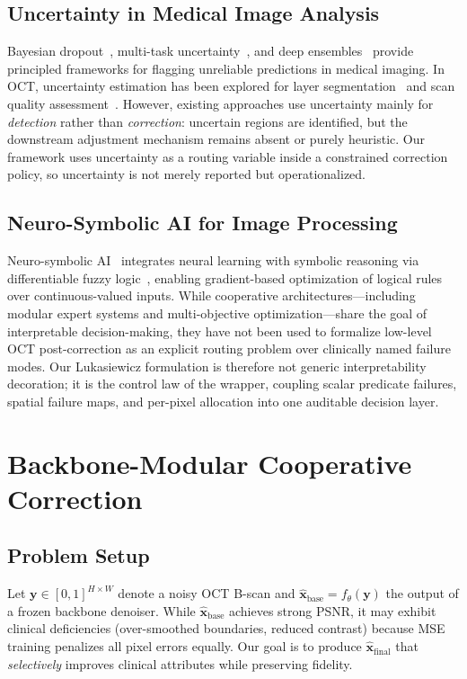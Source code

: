 \documentclass{ieeetj}
\begin{document}
\subsection{Uncertainty in Medical Image Analysis}
Bayesian dropout~\cite{gal2016dropout}, multi-task uncertainty~\cite{kendall2018multi}, and deep ensembles~\cite{lakshminarayanan2017simple} provide principled frameworks for flagging unreliable predictions in medical imaging. In OCT, uncertainty estimation has been explored for layer segmentation~\cite{devalla2018drunet} and scan quality assessment~\cite{wang2019quality}. However, existing approaches use uncertainty mainly for \emph{detection} rather than \emph{correction}: uncertain regions are identified, but the downstream adjustment mechanism remains absent or purely heuristic. Our framework uses uncertainty as a routing variable inside a constrained correction policy, so uncertainty is not merely reported but operationalized.

\subsection{Neuro-Symbolic AI for Image Processing}
Neuro-symbolic AI~\cite{garcez2023neurosymbolic} integrates neural learning with symbolic reasoning via differentiable fuzzy logic~\cite{vankrieken2022analyzing}, enabling gradient-based optimization of logical rules over continuous-valued inputs. While cooperative architectures---including modular expert systems and multi-objective optimization---share the goal of interpretable decision-making, they have not been used to formalize low-level OCT post-correction as an explicit routing problem over clinically named failure modes. Our Lukasiewicz formulation is therefore not generic interpretability decoration; it is the control law of the wrapper, coupling scalar predicate failures, spatial failure maps, and per-pixel allocation into one auditable decision layer.


\section{Backbone-Modular Cooperative Correction}
\label{sec:cooperative}

\subsection{Problem Setup}
\label{sec:problem_setup}
Let $\mathbf{y} \in [0,1]^{H \times W}$ denote a noisy OCT B-scan and $\hat{\mathbf{x}}_\text{base} = f_\theta(\mathbf{y})$ the output of a frozen backbone denoiser. While $\hat{\mathbf{x}}_\text{base}$ achieves strong PSNR, it may exhibit clinical deficiencies (over-smoothed boundaries, reduced contrast) because MSE training penalizes all pixel errors equally. Our goal is to produce $\hat{\mathbf{x}}_\text{final}$ that \emph{selectively} improves clinical attributes while preserving fidelity.
\end{document}
